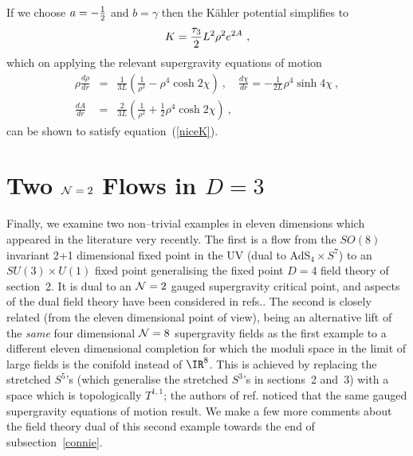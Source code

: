 \documentclass[a4paper,12pt]{article}
\newcommand{\reef}[1]{(\ref{#1})}
\begin{document}
If we choose $a = -{1 \over 2}$ and $b = \gamma$ then the K\"ahler
potential simplifies to
\begin{equation}
  K = {\tau_3 \over 2} L^2 \rho^2 e^{2A}\ ,
\end{equation}
which on applying the relevant supergravity equations of motion 
\begin{eqnarray}
\rho\frac{d\rho}{d r}&=&
\frac{1}{3L}\left( \frac{1}{\rho^2}-\rho^4\cosh 2\chi\right)\ , \quad 
\frac{d\chi}{dr}= -\frac{1}{2L}\rho^4\sinh 4\chi\ ,\nonumber\\
\frac{d A}{d r}&=& \frac{2}{3L}\left( \frac{1}{\rho^2}+
\frac{1}{2}\rho^4\cosh 2\chi\right)\ ,
\end{eqnarray}
can be shown to satisfy
equation~\reef{niceK}.

\section{Two ${\cal N}=2$ Flows in $D=3$}
\label{M2sec}

Finally, we examine two non--trivial examples in eleven dimensions
which appeared in the literature very recently\cite{newwarner}. The
first is a flow from the $SO(8)$ invariant 2+1 dimensional fixed point
in the UV (dual to AdS$_4\times S^7$) to an $SU(3)\times U(1)$ fixed
point generalising the fixed point $D=4$ field theory of section~2. It
is dual to an ${\cal N}=2$ gauged supergravity critical
point\cite{nicolai}, and aspects of the dual field theory have been
considered in refs.\cite{ahn}. The second is closely related (from the
eleven dimensional point of view), being an alternative lift of the
{\it same} four dimensional ${\cal N}=8$ supergravity fields as the
first example to a different eleven dimensional completion for which
the moduli space in the limit of large fields is the conifold instead
of $\IR^8$. This is achieved by replacing the stretched $S^5$'s (which
generalise the stretched $S^3$'s in sections~2 and~3) with a space
which is topologically $T^{1,1}$; the authors of ref.\cite{newwarner}
noticed that the same gauged supergravity equations of motion result.
We make a few more comments about the field theory dual of this second
example towards the end of subsection~\ref{connie}.
\end{document}
